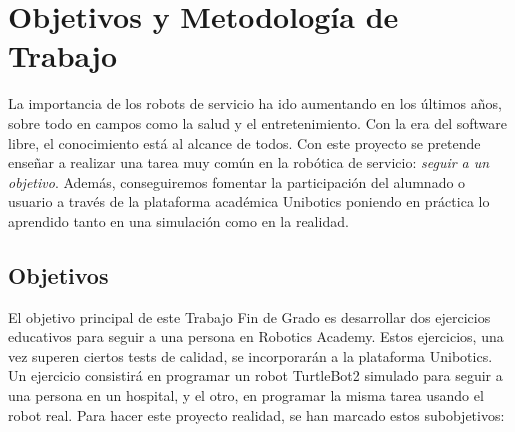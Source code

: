 \chapter{Objetivos y Metodología de Trabajo}
\label{cap:capitulo2}

La importancia de los robots de servicio ha ido aumentando en los últimos años, sobre todo en campos como la salud y el entretenimiento. Con la era del software libre, el conocimiento está al alcance de todos. Con este proyecto se pretende enseñar a realizar una tarea muy común en la robótica de servicio: \textit{seguir a un objetivo}. Además, conseguiremos fomentar la participación del alumnado o usuario a través de la plataforma académica Unibotics poniendo en práctica lo aprendido tanto en una simulación como en la realidad.




\section{Objetivos}
\label{sec:objetivos}
El objetivo principal de este Trabajo Fin de Grado es desarrollar dos ejercicios educativos para seguir a una persona en Robotics Academy. Estos ejercicios, una vez superen ciertos tests de calidad, se incorporarán a la plataforma Unibotics. Un ejercicio consistirá en programar un robot TurtleBot2 simulado para seguir a una persona en un hospital, y el otro, en programar la misma tarea usando el robot real. Para hacer este proyecto realidad, se han marcado estos subobjetivos:

